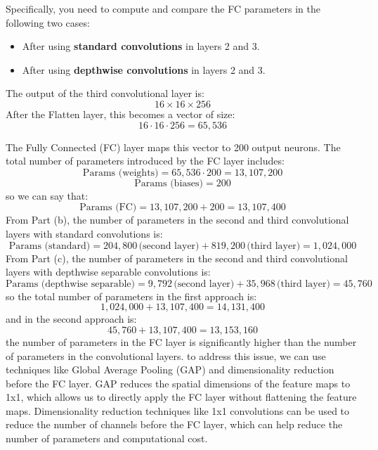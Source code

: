Specifically, you need to compute and compare the FC parameters in the following two cases:

\begin{itemize}
    \item After using \textbf{standard convolutions} in layers 2 and 3.
    \item After using \textbf{depthwise convolutions} in layers 2 and 3.
\end{itemize}

\begin{qsolve}
    \begin{qsolve}[]
        
        The output of the third convolutional layer is:
        \[
        16 \times 16 \times 256
        \]
        After the Flatten layer, this becomes a vector of size:
        \[
        16 \cdot 16 \cdot 256 = 65,536
        \]

        The Fully Connected (FC) layer maps this vector to 200 output neurons. The total number of parameters introduced by the FC layer includes:
        \[
        \text{Params (weights)} = 65,536 \cdot 200 = 13,107,200
        \]
        \[
        \text{Params (biases)} = 200
        \]
        \splitqsolve[\splitqsolve]
        so we can say that:
        \[
        \text{Params (FC)} = 13,107,200 + 200 = 13,107,400
        \]
        From Part (b), the number of parameters in the second and third convolutional layers with standard convolutions is:
        \[
        \text{Params (standard)} = 204,800 \, \text{(second layer)} + 819,200 \, \text{(third layer)} = 1,024,000
        \]
        From Part (c), the number of parameters in the second and third convolutional layers with depthwise separable convolutions is:
        \[
        \text{Params (depthwise separable)} = 9,792 \, \text{(second layer)} + 35,968 \, \text{(third layer)} = 45,760
        \]
        so the total number of parameters in the first approach is:
        \[
        1,024,000 + 13,107,400 = 14,131,400
        \]
        and in the second approach is:
        \[
        45,760 + 13,107,400 = 13,153,160
        \]
        the number of parameters in the FC layer is significantly higher than the number of parameters in the convolutional layers. 
        to address this issue, we can use techniques like Global Average Pooling (GAP) and dimensionality reduction before the FC layer.
        GAP reduces the spatial dimensions of the feature maps to 1x1, which allows us to directly apply the FC layer without flattening the feature maps.
        Dimensionality reduction techniques like 1x1 convolutions can be used to reduce the number of channels before the FC layer, which can help reduce the number of parameters and computational cost.


\end{qsolve}
\end{qsolve}
